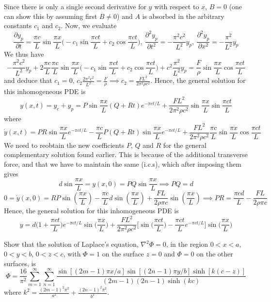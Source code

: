 \documentclass[a4paper]{article}
\begin{document}
\begin{ans}
Since there is only a single second derivative for $y$ with respect to $x$, $B=0$ (one can show this by assuming first $B\neq0$) and $A$ is absorbed in the arbitrary constants $c_1$ and $c_2$. Now, we evaluate
$$\frac{\partial y_p}{\partial t}=\frac{\pi c}{L}\sin\frac{\pi x}{L}\bigg(-c_1\sin\frac{\pi ct}{L}+c_2\cos\frac{\pi ct}{L}\bigg),~\frac{\partial^2y_p}{\partial t^2}=-\frac{\pi^2c^2}{L^2}y_p,~\frac{\partial^2y_p}{\partial x^2}=-\frac{\pi^2}{L^2}y_p$$
We thus have
$$-\frac{\pi^2c^2}{L^2}y_p+2\frac{\pi c}{L}\frac{\pi c}{L}\sin\frac{\pi x}{L}\bigg(-c_1\sin\frac{\pi ct}{L}+c_2\cos\frac{\pi ct}{L}\bigg)+c^2\frac{\pi^2}{L^2}y_p=\frac{F}{\rho}\sin\frac{\pi x}{L}\cos\frac{\pi ct}{L}$$
and deduce that $c_1=0$, $c_2\frac{2\pi^2c^2}{L^2}=\frac{F}{\rho}\implies c_2=\frac{FL^2}{2\pi^2\rho c^2}$. Hence, the general solution for this inhomogeneous PDE is
$$y(x,t)=y_c+y_p=P\sin\frac{\pi x}{L}(Q+Rt)e^{-\pi ct/L}+\frac{FL^2}{2\pi^2\rho c^2}\sin\frac{\pi x}{L}\sin\frac{\pi ct}{L}$$
where
$$\dot{y}(x,t)=PR\sin\frac{\pi x}{L}e^{-\pi ct/L}-\frac{\pi c}{L}P(Q+Rt)\sin\frac{\pi x}{L}e^{-\pi ct/L}+\frac{FL^2}{2\pi^2\rho c^2}\frac{\pi c}{L}\sin\frac{\pi x}{L}\cos\frac{\pi ct}{L}$$
We need to reobtain the new coefficients $P$, $Q$ and $R$ for the general complementary solution found earlier. This is because of the additional transverse force, and that we have to maintain the same (i.c.s), which after imposing them gives
$$d\sin\frac{\pi x}{L}=y(x,0)=PQ\sin\frac{\pi x}{L}\implies PQ=d$$
$$0=\dot{y}(x,0)=RP\sin(\frac{\pi x}{L})-\frac{\pi c}{L}d\sin(\frac{\pi x}{L})+\frac{FL}{2\rho\pi c}\sin(\frac{\pi x}{L})\implies PR=\frac{\pi cd}{L}-\frac{FL}{2\rho\pi c}$$
Hence, the general solution for this inhomogeneous PDE is
$$y=d\bigg(1+\frac{\pi ct}{L}\bigg)e^{-\pi ct/L}\sin\bigg(\frac{\pi x}{L}\bigg)+\frac{FL^2}{2\pi^2\rho c^2}\bigg[\sin\bigg(\frac{\pi ct}{L}\bigg)-\frac{\pi ct}{L}e^{-\pi ct/L}\bigg]\sin\bigg(\frac{\pi x}{L}\bigg)$$
\end{ans}
\begin{qns}
Show that the solution of Laplace's equation, $\nabla^2\Phi=0$, in the region $0 < x < a$,
$0 < y < b$, $0 < z < c$, with $\Phi= 1$ on the surface $z = 0$ and $\Phi= 0$ on the other surfaces, is
$$\Phi=\frac{16}{\pi^2}\sum_{m=1}^\infty\sum_{n=1}^\infty\frac{\sin[(2m-1)\pi x/a]\sin[(2n-1)\pi y/b]\sinh[k(c-z)]}{(2m-1)(2n-1)\sinh(kc)}$$
where $k^2=\frac{(2m-1)^2\pi^2}{a^2}+\frac{(2n-1)^2\pi^2}{b^2}$. 
\end{qns}
\newpage
\end{document}
